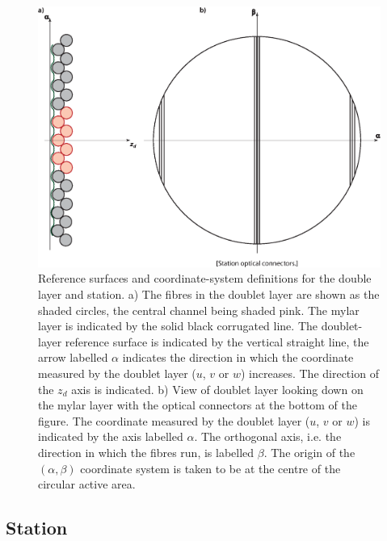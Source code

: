 \begin{figure}
  \begin{center}
    \includegraphics[width=0.95\linewidth]
      {03-Reference-surfaces-and-coordinate-systems/Figures/doublet-layer.eps}
  \end{center}
  \caption{
    Reference surfaces and coordinate-system definitions for the
    double layer and station.
    a) The fibres in the doublet layer are shown as the shaded
    circles, the central channel being shaded pink.
    The mylar layer is indicated by the solid black corrugated line.
    The doublet-layer reference surface is indicated by the vertical
    straight line, the arrow labelled $\alpha$ indicates the direction
    in which the coordinate measured by the doublet layer ($u$, $v$ or
    $w$) increases.
    The direction of the $z_d$ axis is indicated.
    b) View of doublet layer looking down on the mylar layer with the
    optical connectors at the bottom of the figure.
    The coordinate measured by the doublet layer ($u$, $v$ or $w$) is
    indicated by the axis labelled $\alpha$.
    The orthogonal axis, i.e. the direction in which the fibres
    run, is labelled $\beta$.
    The origin of the $(\alpha, \beta)$ coordinate system is taken to
    be at the centre of the circular active area.
  }
  \label{Fig:DblLyrRef&Coord}
\end{figure}

\subsection{Station}
\label{SubSect:RefCoordStn}

